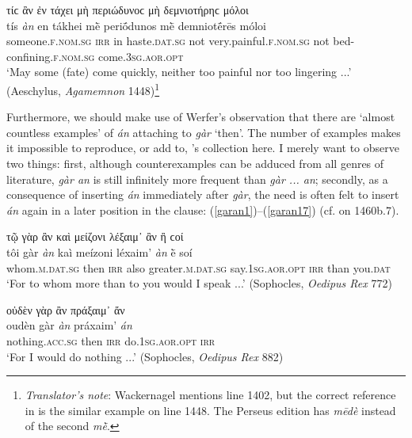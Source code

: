 \begin{exe}
\ex τίϲ ἂν ἐν τάχει μὴ περιώδυνοϲ μὴ δεμνιοτήρηϲ μόλοι\\
\gll tís \emph{àn} en tákhei mḕ periṓdunos mḕ demniotḗrēs móloi\\
someone.\textsc{f.nom.sg} \textsc{irr} in haste.\textsc{dat.sg} not very.painful.\textsc{f.nom.sg} not bed-confining.\textsc{f.nom.sg} come.\textsc{3sg.aor.opt}\\
\trans `May some (fate) come quickly, neither too painful nor too lingering ...' (Aeschylus, \textit{Agamemnon} 1448)\footnote{\emph{Translator's note}: Wackernagel mentions line 1402, but the correct reference in \citet{Jebb1889} is the similar example on line 1448. The Perseus edition has \textit{mēdè} instead of the second \textit{mḕ}.}
\label{jebbagam}
\end{exe}

Furthermore, we should make use of Werfer's \citeyearpar[264ff.]{Werfer1814} observation that there are `almost countless examples' of \emph{án} attaching to \emph{gàr} `then'. The number of examples makes it impossible to reproduce, or add to, \citeauthor{Werfer1814}'s collection here. I merely want to observe two things: first, although counterexamples can be adduced from all genres of literature, \emph{gàr an} is still infinitely more frequent than \emph{gàr ... an}; secondly, as a consequence of inserting \emph{án} immediately after \emph{gàr}, the need is often felt to insert \emph{án} again in a later position in the clause: (\ref{garan1})--(\ref{garan17}) (cf. \citealp[408]{Vahlen1865} on 1460b.7).

\begin{exe}
\ex τῷ γὰρ ἂν καὶ μείζονι λέξαιμ᾽ ἂν ἢ ϲοί\\
\gll tôi gàr \emph{àn} kaì meízoni léxaim' \emph{àn} ḕ soí\\
whom.\textsc{m.dat.sg} then \textsc{irr} also greater.\textsc{m.dat.sg} say.\textsc{1sg.aor.opt} \textsc{irr} than you.\textsc{dat}\\
\trans `For to whom more than to you would I speak ...' (Sophocles, \textit{Oedipus Rex} 772)
\label{garan1}
\end{exe}

\begin{exe}
\ex οὐδὲν γὰρ ἂν πράξαιμ᾽ ἄν\\
\gll oudèn gàr \emph{àn} práxaim' \emph{án}\\
nothing.\textsc{acc.sg} then \textsc{irr} do.\textsc{1sg.aor.opt} \textsc{irr}\\
\trans `For I would do nothing ...' (Sophocles, \textit{Oedipus Rex} 882)
\label{garan2}
\end{exe}

